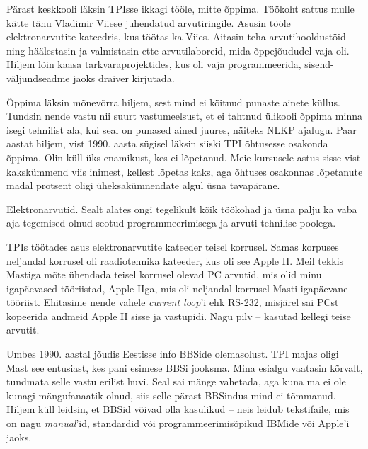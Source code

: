 
Pärast keskkooli läksin TPIsse ikkagi tööle, mitte õppima. Töökoht sattus mulle kätte tänu 
Vladimir Viiese juhendatud arvutiringile. 
Asusin tööle 
elektronarvutite kateedris, kus töötas ka Viies. Aitasin teha arvutihooldustöid ning 
häälestasin ja valmistasin ette arvutilaboreid, mida õppejõududel vaja oli. 
Hiljem lõin kaasa
tarkvaraprojektides, kus oli vaja programmeerida, 
sisend-väljundseadme jaoks draiver kirjutada. 


Õppima läksin mõnevõrra hiljem, sest mind ei köitnud
punaste ainete küllus. Tundsin 
nende vastu nii suurt vastumeelsust, et ei tahtnud ülikooli 
õppima minna isegi tehnilist ala, kui seal on punased ained juures, näiteks NLKP ajalugu. Paar aastat hiljem, vist 1990. aasta sügisel läksin siiski TPI õhtusesse osakonda õppima. Olin 
küll üks enamikust, kes ei lõpetanud. Meie kursusele astus sisse vist 
kakskümmend viis inimest, kellest lõpetas kaks, aga õhtuses osakonnas lõpetanute madal protsent oligi üheksakümnendate algul üsna tavapärane. 


Elektronarvutid. Sealt alates ongi tegelikult kõik töökohad ja üsna palju ka vaba aja tegemised olnud seotud programmeerimisega ja arvuti tehnilise poolega.

TPIs töötades asus elektronarvutite kateeder teisel korrusel. 
Samas korpuses neljandal korrusel oli raadiotehnika 
kateeder, kus oli see Apple II. Meil tekkis 
Mastiga  
mõte ühendada teisel korrusel olevad PC arvutid, mis olid minu igapäevased tööriistad, 
Apple IIga, mis oli neljandal korrusel Masti igapäevane tööriist. 
Ehitasime nende vahele \emph{current loop}'i ehk RS-232, 
misjärel sai PCst kopeerida andmeid Apple II sisse ja vastupidi. 
Nagu pilv -- kasutad kellegi teise arvutit. 

Umbes 1990. aastal jõudis Eestisse info BBSide olemasolust. TPI majas oligi Mast see 
entusiast, kes pani esimese BBSi jooksma. Mina esialgu vaatasin 
kõrvalt, tundmata selle vastu erilist huvi. Seal sai mänge vahetada, 
aga kuna ma ei ole kunagi mängufanaatik olnud, siis selle pärast
BBSindus mind ei tõmmanud. Hiljem küll 
leidsin, et BBSid võivad olla kasulikud -- 
neis leidub tekstifaile, mis on nagu
\emph{manual}'id, standardid või
programmeerimisõpikud IBMide või Apple'i jaoks.


